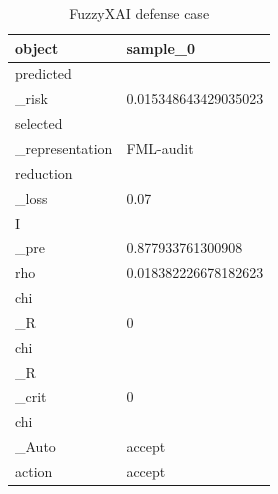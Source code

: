 \begin{table}[h]
\centering
\caption{FuzzyXAI defense case}
\begin{tabular}{|l|l|}
\hline
object & sample_0 \\ \hline
predicted\\_risk & 0.015348643429035023 \\ \hline
selected\\_representation & FML-audit \\ \hline
reduction\\_loss & 0.07 \\ \hline
I\\_pre & 0.877933761300908 \\ \hline
rho & 0.018382226678182623 \\ \hline
chi\\_R & 0 \\ \hline
chi\\_R\\_crit & 0 \\ \hline
chi\\_Auto & accept \\ \hline
action & accept \\ \hline
\end{tabular}
\end{table}